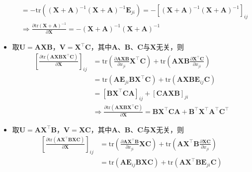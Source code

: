 \documentclass{ctexart}
\theoremstyle{definition}
\def \Av {\mathbf{A}}
\def \Bv {\mathbf{B}}
\def \Cv {\mathbf{C}}
\def \Ev {\mathbf{E}}
\def \Uv {\mathbf{U}}
\def \Vv {\mathbf{V}}
\def \Xv {\mathbf{X}}
\def \tr {\mathrm{tr}}
\begin{document}
\begin{itemize}
\begin{align*}
                                                                                    & = - \tr \left( (\Xv + \Av)^{-1} (\Xv + \Av)^{-1} \Ev_{ji}  \right) = - [(\Xv + \Av)^{-1} (\Xv + \Av)^{-1}]_{ij}                                                              \\
                                                                                    & \Longrightarrow \frac{\partial \tr(\Xv + \Av)^{-1}}{\partial \Xv} = - (\Xv + \Av)^{-1} (\Xv + \Av)^{-1}
          \end{align*}
    \item 取$\Uv = \Av \Xv \Bv$，$\Vv = \Xv^\top \Cv$，其中$\Av$、$\Bv$、$\Cv$与$\Xv$无关，则
          \begin{align*}
              \left[ \frac{\partial \tr(\Av \Xv \Bv \Xv^\top \Cv)}{\partial \Xv} \right]_{ij} & = \tr \left( \frac{\partial \Av \Xv \Bv}{\partial x_{ji}} \Xv^\top \Cv \right) + \tr \left( \Av \Xv \Bv \frac{\partial \Xv^\top \Cv}{\partial x_{ji}} \right) \\
                                                                                              & = \tr \left( \Av \Ev_{ji} \Bv \Xv^\top \Cv \right) + \tr \left( \Av \Xv \Bv \Ev_{ij} \Cv \right)                                                              \\
                                                                                              & = [\Bv \Xv^\top \Cv \Av]_{ij} + [\Cv \Av \Xv \Bv]_{ji}                                                                                                        \\
                                                                                              & \Longrightarrow \frac{\partial \tr(\Av \Xv \Bv \Xv^\top \Cv)}{\partial \Xv} = \Bv \Xv^\top \Cv \Av + \Bv^\top \Xv^\top \Av^\top \Cv^\top
          \end{align*}
    \item 取$\Uv = \Av \Xv^\top \Bv$，$\Vv = \Xv \Cv$，其中$\Av$、$\Bv$、$\Cv$与$\Xv$无关，则
          \begin{align*}
              \left[ \frac{\partial \tr(\Av \Xv^\top \Bv \Xv \Cv)}{\partial \Xv} \right]_{ij} & = \tr \left( \frac{\partial \Av \Xv^\top \Bv}{\partial x_{ji}} \Xv \Cv \right) + \tr \left( \Av \Xv^\top \Bv \frac{\partial \Xv \Cv}{\partial x_{ji}} \right) \\
                                                                                              & = \tr \left( \Av \Ev_{ij} \Bv \Xv \Cv \right) + \tr \left( \Av \Xv^\top \Bv \Ev_{ji} \Cv \right)                                                              \\

\end{align*}
\end{itemize}
\end{document}
